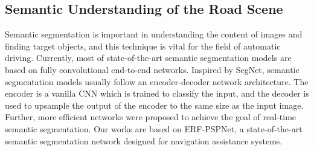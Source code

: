 \documentclass[a4paper]{spie}
\begin{document}
\subsection{Semantic Understanding of the Road Scene}
\label{sec:title}
Semantic segmentation is important in understanding the content of images and finding target objects, and this technique is vital for the field of automatic driving\cite{xiang2019importance,xiang2019comparative}. Currently, most of state-of-the-art semantic segmentation models are based on fully convolutional end-to-end networks\cite{shelhamer2016fully}. Inspired by SegNet\cite{badrinarayanan2017segnet}, semantic segmentation models usually follow an encoder-decoder network architecture. The encoder is a vanilla CNN which is trained to classify the input, and the decoder is used to upsample the output of the encoder to the same size as the input image\cite{zhao2017pyramid,chen2017deeplab,chen2014semantic,chen2017rethinking,chen2018encoder}. Further, more efficient networks were proposed to achieve the goal of real-time semantic segmentation\cite{romera2019bridging,paszke2016enet,romera2017erfnet}. Our works are based on ERF-PSPNet\cite{yang2018unifying,yang2019can}, a state-of-the-art semantic segmentation network designed for navigation assistance systems.
\end{document}
